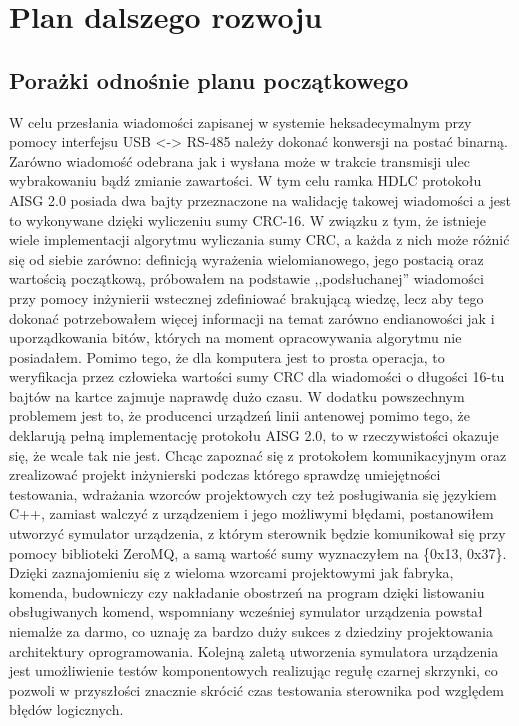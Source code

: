 \chapter{Plan dalszego rozwoju}
\section{Porażki odnośnie planu początkowego}
    W celu przesłania wiadomości zapisanej w systemie heksadecymalnym przy pomocy interfejsu USB <-> RS-485
    należy dokonać konwersji na postać binarną. Zarówno wiadomość odebrana jak i wysłana może w trakcie transmisji ulec wybrakowaniu bądź
    zmianie zawartości. W tym celu ramka HDLC protokołu AISG 2.0 posiada dwa bajty przeznaczone na walidację takowej wiadomości a jest to wykonywane
    dzięki wyliczeniu sumy CRC-16. W związku z tym, że istnieje wiele implementacji algorytmu wyliczania sumy CRC, a każda z nich może różnić się od siebie zarówno:
    definicją wyrażenia wielomianowego, jego postacią oraz wartością początkową, próbowałem na podstawie ,,podsłuchanej'' wiadomości przy pomocy
    inżynierii wstecznej zdefiniować brakującą wiedzę, lecz aby tego dokonać potrzebowałem więcej informacji na temat zarówno endianowości
    jak i uporządkowania bitów, których na moment opracowywania algorytmu nie posiadałem. Pomimo tego, że dla komputera jest to prosta operacja, to weryfikacja przez człowieka
    wartości sumy CRC dla wiadomości o długości 16-tu bajtów na kartce zajmuje naprawdę dużo czasu. W dodatku powszechnym problemem jest to, że 
    producenci urządzeń linii antenowej pomimo tego, że deklarują pełną implementację protokołu AISG 2.0, to w rzeczywistości okazuje się, że
    wcale tak nie jest. Chcąc zapoznać się z protokołem komunikacyjnym oraz zrealizować projekt inżynierski podczas którego sprawdzę umiejętności testowania,
    wdrażania wzorców projektowych czy też posługiwania się językiem C++, zamiast walczyć z urządzeniem i jego możliwymi błędami, postanowiłem
    utworzyć symulator urządzenia, z którym sterownik będzie komunikował się przy pomocy biblioteki ZeroMQ, a samą wartość sumy wyznaczyłem na \{0x13, 0x37\}. 
    Dzięki zaznajomieniu się z wieloma wzorcami projektowymi jak fabryka, komenda, budowniczy czy nakładanie obostrzeń na program dzięki listowaniu obsługiwanych komend, 
    wspomniany wcześniej symulator urządzenia powstał niemalże za darmo, co uznaję za bardzo duży sukces z dziedziny projektowania architektury oprogramowania.
    Kolejną zaletą utworzenia symulatora urządzenia jest umożliwienie testów komponentowych realizując regułę czarnej skrzynki, co pozwoli w przyszłości
    znacznie skrócić czas testowania sterownika pod względem błędów logicznych.
